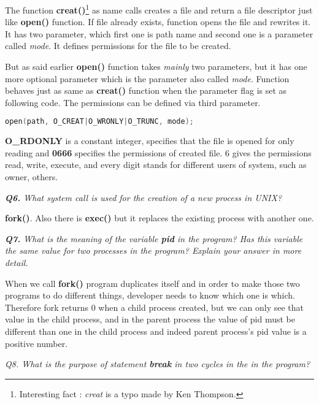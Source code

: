 \documentclass[11pt]{article}
\begin{document}
The function \textbf{creat()}\footnote{Interesting fact : \textit{creat} is a typo made by Ken Thompson.} as name calls creates a file and return a file descriptor just like \textbf{open()} function. If file already exists, function opens the file and rewrites it.  It has two parameter, which first one is path name and second one is a parameter called \textit{mode}. It defines permissions for the file to be created.

But as said earlier \textbf{open()}  function takes \textit{mainly} two parameters, but it has one more optional parameter which is the parameter also called \textit{mode}. Function behaves just as same as \textbf{creat()} function when the parameter flag is set as following code. The permissions can be defined via third parameter.

\begin{lstlisting}[language=C]
open(path, O_CREAT|O_WRONLY|O_TRUNC, mode);
\end{lstlisting}

\textbf{O\_RDONLY} is a constant integer, specifies that the file is opened for only reading and \textbf{0666} specifies the permissions of created file. 6 gives the permissions read, write, execute, and every digit stands for different users of system, such as owner, others.

\vspace{5mm}
\textit{\textbf{Q6.} What system call is used for the creation of a new process in UNIX?}
\vspace{5mm}

\textbf{fork()}. Also there is \textbf{exec()} but it replaces the existing process with another one.

\vspace{5mm}
\textit{\textbf{Q7.} What is the meaning of the variable \textbf{pid} in the program? Has this variable the same value for two processes in the program? Explain your answer in more detail.}
\vspace{5mm}

When we call \textbf{fork()} program duplicates itself and in order to make those two programs to do different things, developer needs to know which one is which. Therefore fork returns 0 when a child process created, but we can only see that value in the child process, and in the parent process the value of pid must be different than one in the child process and indeed parent process's pid value is a positive number.

\vspace{5mm}
\textit{Q8. What is the purpose of statement \textbf{break} in two cycles in the in the program?}
\vspace{5mm}
\end{document}
